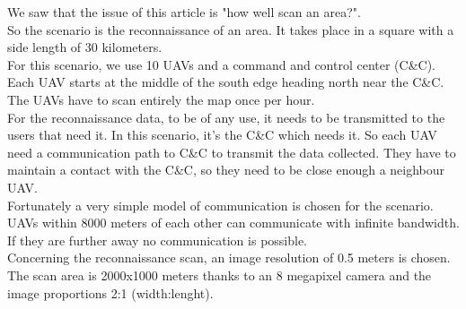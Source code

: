 We saw that the issue of this article is "how well scan an area?".\\

So the scenario is the reconnaissance of an area. It takes place in a square with a side length of 30 kilometers.\\
For this scenario, we use 10 UAVs and a command and control center (C\&C). Each UAV starts at the middle of the south edge heading north near the C\&C.
The UAVs have to scan entirely the map once per hour.\\

For the reconnaissance data, to be of any use, it needs to be transmitted to the users that need it. In this scenario, it's the C\&C which needs it. So each UAV need a communication path to C\&C to transmit the data collected. They have to maintain a contact with the C\&C, so they need to be close enough a neighbour UAV.\\
Fortunately a very simple model of communication is chosen for the scenario.  UAVs  within 8000  meters  of  each  other  can  communicate  with infinite  bandwidth.  If  they  are  further  away  no communication  is  possible.\\

Concerning the reconnaissance scan, an image resolution of 0.5 meters is chosen. The scan area is 2000x1000 meters thanks to an 8 megapixel camera and the image proportions 2:1 (width:lenght).

